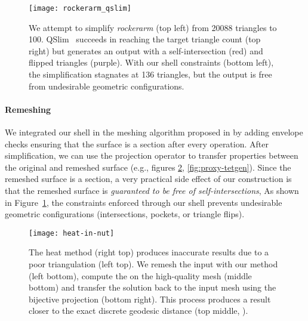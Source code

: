 \begin{figure}
    \centering
    \texttt{[image: rockerarm\_qslim]}
    \caption{We attempt to simplify \protect\emph{rockerarm} (top left) from 20088 triangles to 100. QSlim~\cite{garland1998simplifying} succeeds in reaching the target triangle count (top right) but generates an output with a self-intersection (red) and flipped triangles (purple).
    With our shell constraints (bottom left), the simplification stagnates at 136 triangles, but the output is free from undesirable geometric configurations. 
    }
    \label{fig:qslim100}
    
\end{figure}

\paragraph{Remeshing}
We integrated our shell in the meshing algorithm proposed in \cite{dunyach2013adaptive} by adding envelope checks ensuring that the surface is a section after every operation. After simplification, we can use the projection operator to transfer properties between the original and remeshed surface (e.g., figures \ref{fig:proxy-heat}, \ref{fig:proxy-tetgen}).
Since the  remeshed surface is a section, a very practical side effect of our construction is that the remeshed surface is \emph{guaranteed to be free of self-intersections}, 
As shown in Figure~\ref{fig:qslim100}, the constraints enforced through our shell prevents undesirable geometric configurations (intersections, pockets, or triangle flips).



\begin{figure}
    \centering
    \texttt{[image: heat-in-nut]}
    \caption{The heat method (right top) produces inaccurate results due to a poor triangulation (left top). We remesh the input with our method (left bottom), compute the  on the high-quality mesh (middle bottom) and transfer the solution back to the input mesh using the bijective projection (bottom right). This process produces a result closer to the exact discrete geodesic distance \cite{mitchell1987discrete} (top middle, ).}
    \label{fig:proxy-heat}
    
\end{figure}


